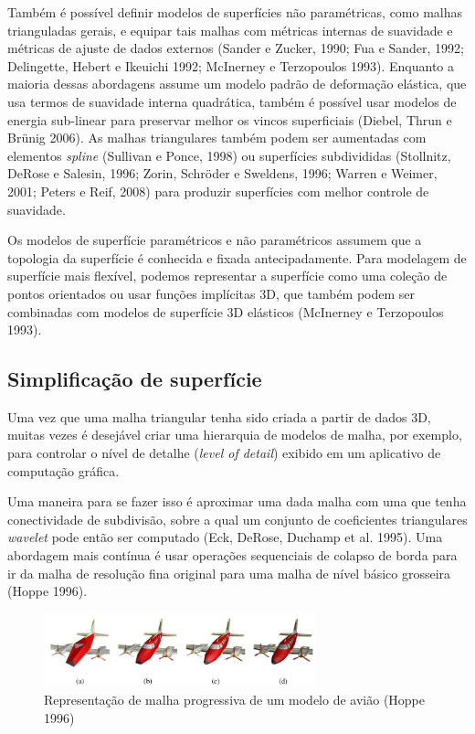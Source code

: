 \documentclass{article}
\begin{document}
Também é possível definir modelos de superfícies não paramétricas, como malhas trianguladas gerais, e equipar tais malhas com métricas internas de suavidade e métricas de ajuste de dados externos (Sander e Zucker, 1990; Fua e Sander, 1992; Delingette, Hebert e Ikeuichi 1992; McInerney e Terzopoulos 1993). Enquanto a maioria dessas abordagens assume um modelo padrão de deformação elástica, que usa termos de suavidade interna quadrática, também é possível usar modelos de energia sub-linear para preservar melhor os vincos superficiais (Diebel, Thrun e Brünig 2006). As malhas triangulares também podem ser aumentadas com elementos \textit{spline} (Sullivan e Ponce, 1998) ou superfícies subdivididas (Stollnitz, DeRose e Salesin, 1996; Zorin, Schröder e Sweldens, 1996; Warren e Weimer, 2001; Peters e Reif, 2008) para produzir superfícies com melhor controle de suavidade.

Os modelos de superfície paramétricos e não paramétricos assumem que a topologia da superfície é conhecida e fixada antecipadamente. Para modelagem de superfície mais flexível, podemos representar a superfície como uma coleção de pontos orientados ou usar funções implícitas 3D, que também podem ser combinadas com modelos de superfície 3D elásticos (McInerney e Terzopoulos 1993).

\subsection{Simplificação de superfície}
\label{subsec:SimplificacaoDeSuperficie}

Uma vez que uma malha triangular tenha sido criada a partir de dados 3D, muitas vezes é desejável criar uma hierarquia de modelos de malha, por exemplo, para controlar o nível de detalhe (\textit{level of detail}) exibido em um aplicativo de computação gráfica.

Uma maneira para se fazer isso é aproximar uma dada malha com uma que tenha conectividade de subdivisão, sobre a qual um conjunto de coeficientes triangulares \textit{wavelet} pode então ser computado (Eck, DeRose, Duchamp et al. 1995). Uma abordagem mais contínua é usar operações sequenciais de colapso de borda para ir da malha de resolução fina original para uma malha de nível básico grosseira (Hoppe 1996).

\begin{figure}[!htb]
    \centering
    \includegraphics[width=0.7\textwidth]{malhaProgressiva.png}
    \caption{Representação de malha progressiva de um modelo de avião (Hoppe 1996)}
    \label{fig:malhaProgressiva}
\end{figure}
\end{document}
